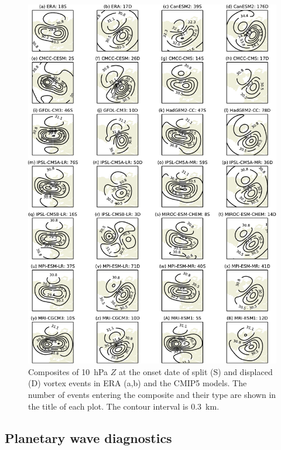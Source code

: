 \begin{figure}
 \centering
 \noindent\includegraphics[width=\textwidth]{figures/chapter-models/10hPa_GPH_composites.pdf}
 \caption[Composites of 10~hPa $Z$ at the onset of split and displaced vortex
 events]{Composites of 10~hPa $Z$ at the onset date of split (S) and displaced
   (D) vortex events in ERA (a,b) and the CMIP5 models. The number of events
   entering the composite and their type are shown in the title of each
   plot. The contour interval is 0.3~km.}
 \label{fig:10hPa_GPH_comp}
\end{figure}

\subsection{Planetary wave diagnostics}

